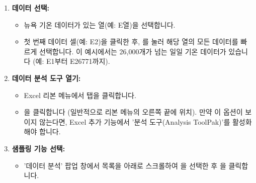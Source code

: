 \documentclass[11pt,a4paper]{article}
\begin{document}
\begin{enumerate}
    \item \textbf{데이터 선택:}
    \begin{itemize}
        \item 뉴욕 기온 데이터가 있는 열(예: E열)을 선택합니다.
        \item 첫 번째 데이터 셀(예: E2)을 클릭한 후, 를 눌러 해당 열의 모든 데이터를 빠르게 선택합니다. 이 예시에서는 26,000개가 넘는 일일 기온 데이터가 있습니다 (예: E1부터 E26771까지).
    \end{itemize}

    \item \textbf{데이터 분석 도구 열기:}
    \begin{itemize}
        \item Excel 리본 메뉴에서  탭을 클릭합니다.
        \item {}을 클릭합니다 (일반적으로 리본 메뉴의 오른쪽 끝에 위치). 만약 이 옵션이 보이지 않는다면, Excel 추가 기능에서 '분석 도구(Analysis ToolPak)'를 활성화해야 합니다.
    \end{itemize}

    \item \textbf{샘플링 기능 선택:}
    \begin{itemize}
        \item '데이터 분석' 팝업 창에서 목록을 아래로 스크롤하여 을 선택한 후 을 클릭합니다.
    \end{itemize}


\end{enumerate}
\end{document}

